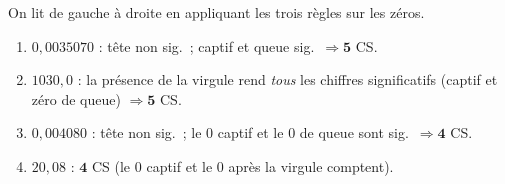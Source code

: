 \documentclass[11pt,a4paper]{article}
\begin{document}
\begin{corrige}
On lit de gauche à droite en appliquant les trois règles sur les zéros.
\begin{enumerate}[label=\alph*)]
  \item $0,0035070$ : tête non sig.\ ; captif et queue sig.\ $\Rightarrow \mathbf{5}$ CS.
  \item $1030,0$ : la présence de la virgule rend \emph{tous} les chiffres significatifs
        (captif et zéro de queue) $\Rightarrow \mathbf{5}$ CS.
  \item $0,004080$ : tête non sig.\ ; le $0$ captif et le $0$ de queue sont sig.\ $\Rightarrow \mathbf{4}$ CS.
  \item $20,08$ : $\mathbf{4}$ CS (le $0$ captif et le $0$ après la virgule comptent).
\end{enumerate}
\end{corrige}
\end{document}
